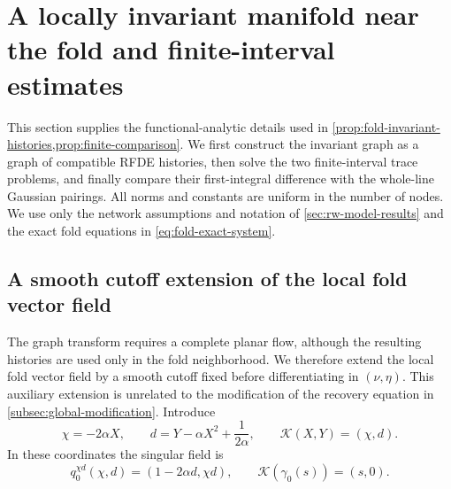 \section{A locally invariant manifold near the fold and finite-interval estimates}
\label{subsec:invariant-history-details}

This section supplies the functional-analytic details used in
\cref{prop:fold-invariant-histories,prop:finite-comparison}.  We first
construct the invariant graph as a graph of compatible RFDE histories, then
solve the two finite-interval trace problems, and finally compare their
first-integral difference with the whole-line Gaussian pairings.  All norms
and constants are uniform in the number of nodes.  We use only the network
assumptions and notation of \cref{sec:rw-model-results} and the exact fold
equations in \cref{eq:fold-exact-system}.

\subsection{A smooth cutoff extension of the local fold vector field}

The graph transform requires a complete planar flow, although the resulting
histories are used only in the fold neighborhood.  We therefore extend the
local fold vector field by a smooth cutoff fixed before differentiating in
\((\nu,\eta)\).  This auxiliary extension is unrelated to the modification of
the recovery equation in \cref{subsec:global-modification}.
Introduce
\begin{equation}
 \chi=-2\alpha X,\qquad
 d=Y-\alpha X^2+\frac1{2\alpha},\qquad
 \mathcal K(X,Y)=(\chi,d).
 \label{eq:supp-fold-coordinates}
\end{equation}
In these coordinates the singular field is
\begin{equation}
 q_0^{\chi d}(\chi,d)=(1-2\alpha d,\chi d),
 \qquad \mathcal K(\gamma_0(s))=(s,0).
 \label{eq:supp-singular-field-chi-d}
\end{equation}

